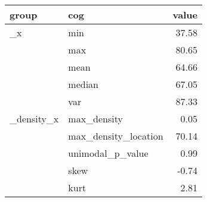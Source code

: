 \begin{tabular}{llr}
  \toprule
 \textnormal{group} & \textnormal{cog} & \textnormal{value} \\ 
  \midrule
   \_x & min & 37.58 \\ 
    & max & 80.65 \\ 
    & mean & 64.66 \\ 
    & median & 67.05 \\ 
  \bigskip  & var & 87.33 \\ 
   \_density\_x & max\_density & 0.05 \\ 
    & max\_density\_location & 70.14 \\ 
    & unimodal\_p\_value & 0.99 \\ 
    & skew & -0.74 \\ 
    & kurt & 2.81 \\ 
   \bottomrule
\end{tabular}
